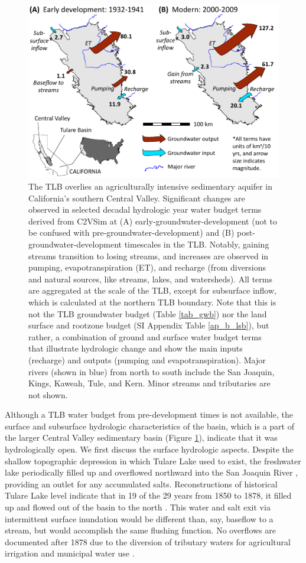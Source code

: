\begin{figure}[H]
	\centering
	\includegraphics[width=.7\textwidth]{ch3_figs/study_site_water_budget_riv.pdf}
	\caption{The TLB overlies an agriculturally intensive sedimentary aquifer in California's southern Central Valley. Significant changes are observed in selected decadal hydrologic year water budget terms derived from C2VSim at (A) early-groundwater-development (not to be confused with pre-groundwater-development) and (B) post-groundwater-development timescales in the TLB. Notably, gaining streams transition to losing streams, and increases are observed in pumping, evapotranspiration (ET), and recharge (from diversions and natural sources, like streams, lakes, and watersheds). All terms are aggregated at the scale of the TLB, except for subsurface inflow, which is calculated at the northern TLB boundary. Note that this is not the TLB groundwater budget (Table \ref{tab_gwb}) nor the land surface and rootzone budget (SI Appendix Table \ref{ap_b_lsb}), but rather, a combination of ground and surface water budget terms that illustrate hydrologic change and show the main inputs (recharge) and outputs (pumping and evapotranspiration). Major rivers (shown in blue) from north to south include the San Joaquin, Kings, Kaweah, Tule, and Kern. Minor streams and tributaries are not shown.}
	\label{fig:tb_study_site}
\end{figure}

Although a TLB water budget from pre-development times is not available, the surface and subsurface hydrologic characteristics of the basin, which is a part of the larger Central Valley sedimentary basin (Figure \ref{fig:tb_study_site}), indicate that it was hydrologically open. We first discuss the surface hydrologic aspects. Despite the shallow topographic depression in which Tulare Lake used to exist, the freshwater lake periodically filled up and overflowed northward into the San Joaquin River \citep{grunsky1898irrigation, Davis1959}, providing an outlet for any accumulated salts. Reconstructions of historical Tulare Lake level indicate that in 19 of the 29 years from 1850 to 1878, it filled up and flowed out of the basin to the north \citep{USBR1970}. This water and salt exit via intermittent surface inundation would be different than, say, baseflow to a stream, but would accomplish the same flushing function. No overflows are documented after 1878 due to the diversion of tributary waters for agricultural irrigation and municipal water use \citep{ecorp2007}. 


